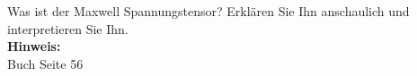 \begin{question}[section=2,subsection=23,name={Maxwell Spannungstensor},difficulty=4,type=mdl,mode=exm,tags={}]
	Was ist der Maxwell Spannungstensor? Erklären Sie Ihn anschaulich und interpretieren Sie Ihn.
	\\ \textbf{Hinweis:}\\
	Buch Seite 56
\end{question}
\begin{solution}
	
\end{solution}